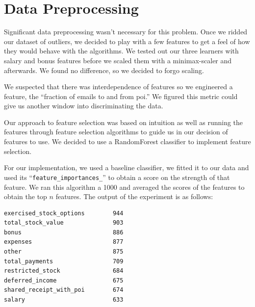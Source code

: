 \documentclass[twoside,openright,titlepage,numbers=noenddot,headinclude,%
               footinclude=true,cleardoublepage=empty,abstractoff,BCOR=5mm,%
               paper=a4,fontsize=11pt,ngerman,american]{scrreprt}
\numberwithin{theorem}{chapter}
\numberwithin{definition}{chapter}
\numberwithin{algorithm}{chapter}
\numberwithin{figure}{chapter}
\numberwithin{table}{chapter}
\numberwithin{equation}{chapter}
\begin{document}
\section*{Data Preprocessing}
Significant data preprocessing wasn't necessary for this problem. Once we ridded our dataset of outliers, we decided to play with a few features to get a feel of how they would behave with the algorithms. We tested out our three learners with salary and bonus features before we scaled them with a minimax-scaler and afterwards. We found no difference, so we decided to forgo scaling.

We suspected that there was interdependence of features so we engineered a feature, the ``fraction of emails to and from poi.'' We figured this metric could give us another window into discriminating the data. 

Our approach to feature selection was based on intuition as well as running the features through feature selection algorithms to guide us in our decision of features to use. We decided to use a RandomForest classifier to implement feature selection.

For our implementation, we used a baseline classifier, we fitted it to our data and used its ``\texttt{feature\_importances\_}'' to obtain a score on the strength of that feature. We ran this algorithm a 1000 and averaged the scores of the features to obtain the top $n$ features. The output of the experiment is as follows:
\begin{verbatim}
exercised_stock_options        944
total_stock_value              903
bonus                          886
expenses                       877
other                          875
total_payments                 709
restricted_stock               684
deferred_income                675
shared_receipt_with_poi        674
salary                         633
\end{verbatim}
\end{document}

